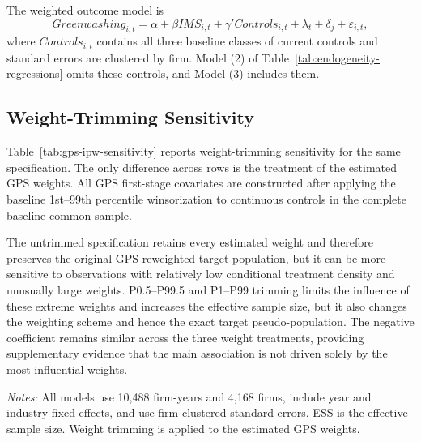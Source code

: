\documentclass[11pt]{article}
\begin{document}
The weighted outcome model is
\[
Greenwashing_{i,t}=\alpha+\beta IMS_{i,t}+\gamma'Controls_{i,t}
+\lambda_t+\delta_j+\varepsilon_{i,t},
\]
where \(Controls_{i,t}\) contains all three baseline classes of current controls and standard errors are clustered by firm. Model (2) of Table~\ref{tab:endogeneity-regressions} omits these controls, and Model (3) includes them.

\subsection{Weight-Trimming Sensitivity}

Table~\ref{tab:gps-ipw-sensitivity} reports weight-trimming sensitivity for the same specification. 
The only difference across rows is the treatment of the estimated GPS weights. All GPS first-stage covariates are constructed after applying the baseline 1st--99th percentile winsorization to continuous controls in the complete baseline common sample.

The untrimmed specification retains every estimated weight and therefore preserves the original GPS reweighted target population, but it can be more sensitive to observations with relatively low conditional treatment density and unusually large weights. 
P0.5--P99.5 and P1--P99 trimming limits the influence of these extreme weights and increases the effective sample size, but it also changes the weighting scheme and hence the exact target pseudo-population. 
The negative coefficient remains similar across the three weight treatments, providing supplementary evidence that the main association is not driven solely by the most influential weights.

\begin{table}[H]
    \centering
    \caption{GPS--IPW Weight-Trimming Sensitivity}
    \label{tab:gps-ipw-sensitivity}
    \par\smallskip
    \begin{minipage}{0.95\textwidth}
        \footnotesize
        \textit{Notes:} All models use 10,488 firm-years and 4,168 firms, include year and industry fixed effects, and use firm-clustered standard errors. ESS is the effective sample size. Weight trimming is applied to the estimated GPS weights.
    \end{minipage}
\end{table}
\end{document}
